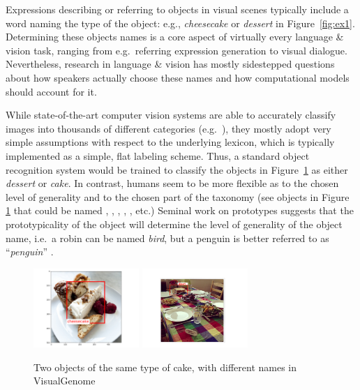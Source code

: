 Expressions describing or referring to objects in visual scenes typically include a word naming the type of the object: e.g.,  \emph{cheesecake} or  \emph{dessert}  in Figure~\ref{fig:ex1}. 
Determining these objects names is a core aspect of virtually every language \& vision task, ranging from e.g.\ referring expression generation to visual dialogue.
Nevertheless, research in language \& vision has mostly  sidestepped questions about how speakers actually choose these names and how computational models should account for it.



While state-of-the-art computer vision systems are able to accurately classify images into thousands of different categories (e.g.\  ), they mostly adopt very simple assumptions with respect to the underlying lexicon, which is typically implemented as a simple, flat labeling scheme. Thus, a standard object recognition system would be trained to classify the objects in Figure~\ref{fig:cake} as either  \emph{dessert} or \emph{cake}.
In contrast, humans seem to be more flexible as to the chosen level of generality and to the chosen part of the taxonomy (see objects in Figure \ref{fig:cake} that could be named , , , , ,  etc.) 
Seminal work on prototypes suggests that the prototypicality of the object will determine the level of generality of the object name, i.e.\  a robin can be named \emph{bird}, but a penguin is better referred to as ``\emph{penguin}'' \cite{Rosch1978}.


\begin{figure}[htbp]
\begin{center}
\includegraphics[height=3cm]{figures/cheescake.png}
\includegraphics[height=3cm]{figures/cheesecak2.pdf}
\caption{Two objects of the same type of cake, with different names in VisualGenome}
\label{fig:cake}
\end{center}
\end{figure}

